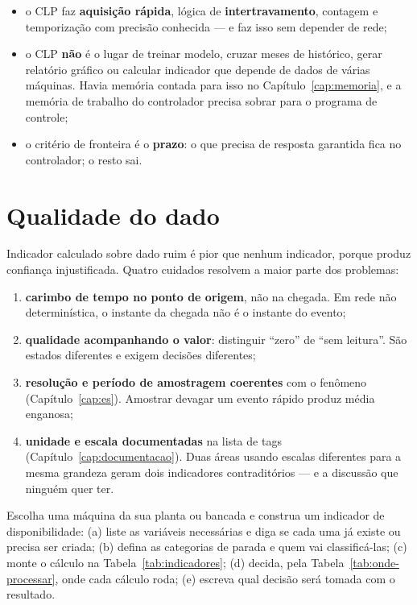 \begin{itemize}
  \item o CLP faz \textbf{aquisição rápida}, lógica de \textbf{intertravamento}, contagem e
        temporização com precisão conhecida --- e faz isso sem depender de rede;
  \item o CLP \textbf{não} é o lugar de treinar modelo, cruzar meses de histórico, gerar relatório
        gráfico ou calcular indicador que depende de dados de várias máquinas. Havia memória
        contada para isso no Capítulo~\ref{cap:memoria}, e a memória de trabalho do controlador
        precisa sobrar para o programa de controle;
  \item o critério de fronteira é o \textbf{prazo}: o que precisa de resposta garantida fica no
        controlador; o resto sai.
\end{itemize}

\section{Qualidade do dado}

Indicador calculado sobre dado ruim é pior que nenhum indicador, porque produz confiança injustificada.
Quatro cuidados resolvem a maior parte dos problemas:

\begin{enumerate}
  \item \textbf{carimbo de tempo no ponto de origem}, não na chegada. Em rede não determinística, o
        instante da chegada não é o instante do evento;
  \item \textbf{qualidade acompanhando o valor}: distinguir ``zero'' de ``sem leitura''. São estados
        diferentes e exigem decisões diferentes;
  \item \textbf{resolução e período de amostragem coerentes} com o fenômeno
        (Capítulo~\ref{cap:es}). Amostrar devagar um evento rápido produz média enganosa;
  \item \textbf{unidade e escala documentadas} na lista de tags (Capítulo~\ref{cap:documentacao}).
        Duas áreas usando escalas diferentes para a mesma grandeza geram dois indicadores
        contraditórios --- e a discussão que ninguém quer ter.
\end{enumerate}

\begin{pratica}
Escolha uma máquina da sua planta ou bancada e construa um indicador de disponibilidade:
(a) liste as variáveis necessárias e diga se cada uma já existe ou precisa ser criada;
(b) defina as categorias de parada e quem vai classificá-las;
(c) monte o cálculo na Tabela~\ref{tab:indicadores};
(d) decida, pela Tabela~\ref{tab:onde-processar}, onde cada cálculo roda;
(e) escreva qual decisão será tomada com o resultado.
\end{pratica}

